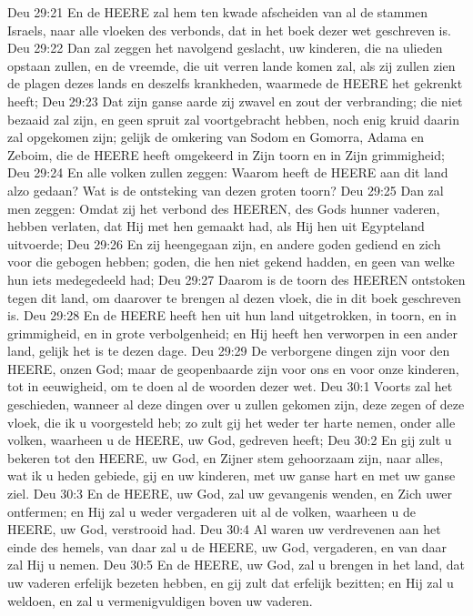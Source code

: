 Deu 29:21  En de HEERE zal hem ten kwade afscheiden van al de stammen Israels, naar alle vloeken des verbonds, dat in het boek dezer wet geschreven is.
Deu 29:22  Dan zal zeggen het navolgend geslacht, uw kinderen, die na ulieden opstaan zullen, en de vreemde, die uit verren lande komen zal, als zij zullen zien de plagen dezes lands en deszelfs krankheden, waarmede de HEERE het gekrenkt heeft;
Deu 29:23  Dat zijn ganse aarde zij zwavel en zout der verbranding; die niet bezaaid zal zijn, en geen spruit zal voortgebracht hebben, noch enig kruid daarin zal opgekomen zijn; gelijk de omkering van Sodom en Gomorra, Adama en Zeboim, die de HEERE heeft omgekeerd in Zijn toorn en in Zijn grimmigheid;
Deu 29:24  En alle volken zullen zeggen: Waarom heeft de HEERE aan dit land alzo gedaan? Wat is de ontsteking van dezen groten toorn?
Deu 29:25  Dan zal men zeggen: Omdat zij het verbond des HEEREN, des Gods hunner vaderen, hebben verlaten, dat Hij met hen gemaakt had, als Hij hen uit Egypteland uitvoerde;
Deu 29:26  En zij heengegaan zijn, en andere goden gediend en zich voor die gebogen hebben; goden, die hen niet gekend hadden, en geen van welke hun iets medegedeeld had;
Deu 29:27  Daarom is de toorn des HEEREN ontstoken tegen dit land, om daarover te brengen al dezen vloek, die in dit boek geschreven is.
Deu 29:28  En de HEERE heeft hen uit hun land uitgetrokken, in toorn, en in grimmigheid, en in grote verbolgenheid; en Hij heeft hen verworpen in een ander land, gelijk het is te dezen dage.
Deu 29:29  De verborgene dingen zijn voor den HEERE, onzen God; maar de geopenbaarde zijn voor ons en voor onze kinderen, tot in eeuwigheid, om te doen al de woorden dezer wet.
Deu 30:1  Voorts zal het geschieden, wanneer al deze dingen over u zullen gekomen zijn, deze zegen of deze vloek, die ik u voorgesteld heb; zo zult gij het weder ter harte nemen, onder alle volken, waarheen u de HEERE, uw God, gedreven heeft;
Deu 30:2  En gij zult u bekeren tot den HEERE, uw God, en Zijner stem gehoorzaam zijn, naar alles, wat ik u heden gebiede, gij en uw kinderen, met uw ganse hart en met uw ganse ziel.
Deu 30:3  En de HEERE, uw God, zal uw gevangenis wenden, en Zich uwer ontfermen; en Hij zal u weder vergaderen uit al de volken, waarheen u de HEERE, uw God, verstrooid had.
Deu 30:4  Al waren uw verdrevenen aan het einde des hemels, van daar zal u de HEERE, uw God, vergaderen, en van daar zal Hij u nemen.
Deu 30:5  En de HEERE, uw God, zal u brengen in het land, dat uw vaderen erfelijk bezeten hebben, en gij zult dat erfelijk bezitten; en Hij zal u weldoen, en zal u vermenigvuldigen boven uw vaderen.
